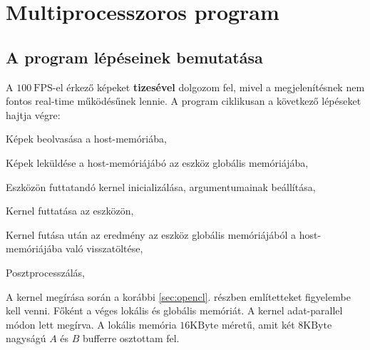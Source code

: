 \chapter{Multiprocesszoros program}
\section{A program lépéseinek bemutatása}
	A $100\ \mathrm{FPS}$-el érkező képeket \textbf{tizesével} dolgozom fel, mivel a megjelenítésnek
	nem fontos real-time működésűnek lennie. 
	A program ciklikusan a következő lépéseket hajtja végre:
	\begin{enumerate*}
		\item Képek beolvasása a host-memóriába,
		\item Képek leküldése a host-memóriájábó az eszköz globális memóriájába,
		\item Eszközön futtatandó kernel inicializálása, argumentumainak beállítása,
		\item Kernel futtatása az eszközön,
		\item Kernel futása után az eredmény az eszköz globális memóriájából a host-memóriájába való
		visszatöltése,
		\item Posztprocesszálás,
	\end{enumerate*}
	A kernel megírása során a korábbi \ref{sec:opencl}. részben említetteket figyelembe kell venni.
	Főként a véges lokális és globális memóriát. A kernel adat-parallel módon lett megírva.
	A lokális memória $16 \mathrm{KByte}$ méretű, amit két $8 \mathrm{KByte}$ nagyságú $A$ és $B$
	bufferre osztottam fel.
	
